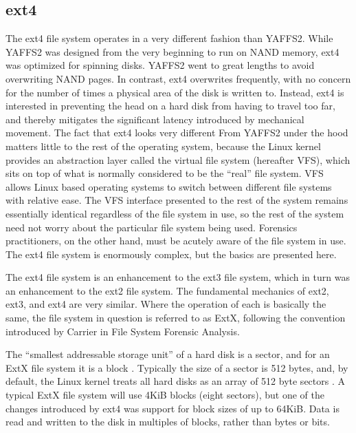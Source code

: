 \subsection{ext4}
The ext4 file system operates in a very different fashion than YAFFS2. While YAFFS2 was designed from the
very beginning to run on NAND memory, ext4 was optimized for spinning disks. YAFFS2 went to great lengths to avoid
overwriting NAND pages. In contrast, ext4 overwrites frequently, with no concern for the number of times a physical area of the disk
is written to. Instead, ext4 is interested in preventing the head on a hard disk from having to travel too far, and thereby
mitigates the significant latency introduced by mechanical movement. The fact that ext4 looks very different From
YAFFS2 under the hood matters little to the rest of the operating system, because the Linux kernel provides an
abstraction layer called the virtual file system (hereafter VFS), which sits on top of what is normally considered to be the
``real'' file system. VFS allows Linux based operating systems to switch between different file systems with relative ease. The VFS
interface presented to the rest of the system remains essentially identical regardless of the file system in use, so the rest of the
system need not worry about the particular file system being used. Forensics practitioners, on the other hand, must be acutely aware
of the file system in use. The ext4 file system is enormously complex, but the basics are presented here.

The ext4 file system is an enhancement to the ext3 file system, which in turn was an enhancement to the
ext2 file system. The fundamental mechanics of ext2, ext3, and ext4 are very similar. Where the
operation of each is basically the same, the file system in question is referred to as ExtX, following the convention
introduced by Carrier \citeyear{carrier} in File System Forensic Analysis. 

The ``smallest addressable storage unit'' of a hard disk is a sector, and for an ExtX file system it is a block
\cite[Chapter 14]{carrier}. Typically the size of a sector is 512 bytes, and, by default, the Linux kernel treats all hard disks as
an array of 512 byte sectors \cite{linuxdrivers}.  A typical ExtX file system will use 4KiB blocks (eight sectors), but one
of the changes introduced by ext4 was support for block sizes of up to 64KiB. Data is read and written to the disk in
multiples of blocks, rather than bytes or bits. 

